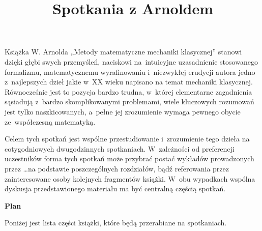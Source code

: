 \documentclass[a4paper,11pt]{article}
\title{Spotkania z Arnoldem}
\begin{document}





\maketitle %





Książka W. Arnolda „Metody matematyczne mechaniki klasycznej”
stanowi dzięki głębi swych przemyśleń, naciskowi na~intuicyjne
uzasadnienie stosowanego formalizmu, matematycznemu wyrafinowaniu
i~niezwykłej erudycji autora jedno z~najlepszych dzieł jakie w~XX
wieku napisano na temat mechaniki klasycznej. Równocześnie jest to
pozycja bardzo trudna, w~której elementarne zagadnienia sąsiadują
z~bardzo skomplikowanymi problemami, wiele kluczowych rozumowań jest
tylko naszkicowanych, a~pełne jej zrozumienie wymaga pewnego obycie
ze~współczesną matematyką.

Celem tych spotkań jest wspólne przestudiowanie i~zrozumienie tego
dzieła na cotygodniowych dwugodzinnych spotkaniach. W~zależności od
preferencji uczestników forma tych spotkań może przybrać postać
wykładów prowadzonych przez \ldots na podstawie poszczególnych
rozdziałów, bądź referowania przez zainteresowane osoby kolejnych
fragmentów książki. W~obu wypadkach wspólna dyskusja przedstawionego
materiału ma być centralną częścią spotkań.




\begin{center}

  \begin{center}

    \textbf{Plan}

  \end{center}

\end{center}




\noindent
Poniżej jest lista części książki, które będą przerabiane na
spotkaniach.
\end{document}
